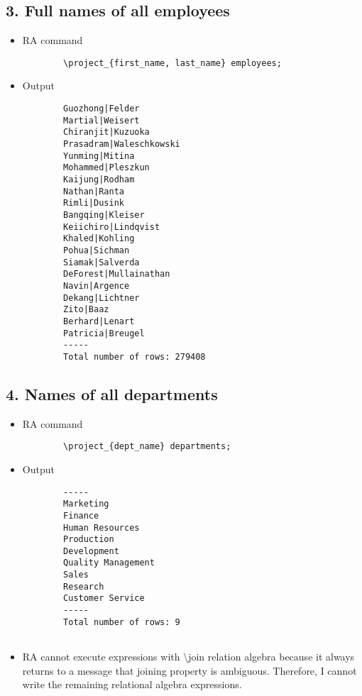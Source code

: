 \documentclass[13pt,a4paper]{report}
\begin{document}
\subsection*{3. Full names of all employees}
\begin{itemize}
	The RA command \textbackslash rename only supports renaming of attributes; it does not support renaming of the input relation. So we just use the \textbackslash project to get first name and last name of the employees.
	\item RA command
	\begin{lstlisting}
		\project_{first_name, last_name} employees;
	\end{lstlisting}

	\item Output
	\begin{lstlisting}
		Guozhong|Felder
		Martial|Weisert
		Chiranjit|Kuzuoka
		Prasadram|Waleschkowski
		Yunming|Mitina
		Mohammed|Pleszkun
		Kaijung|Rodham
		Nathan|Ranta
		Rimli|Dusink
		Bangqing|Kleiser
		Keiichiro|Lindqvist
		Khaled|Kohling
		Pohua|Sichman
		Siamak|Salverda
		DeForest|Mullainathan
		Navin|Argence
		Dekang|Lichtner
		Zito|Baaz
		Berhard|Lenart
		Patricia|Breugel
		-----
		Total number of rows: 279408

	\end{lstlisting}
\end{itemize}

\subsection*{4. Names of all departments}
\begin{itemize}
	\item RA command
	\begin{lstlisting}
		\project_{dept_name} departments;
	\end{lstlisting}

	\item Output
	\begin{lstlisting}
		-----
		Marketing
		Finance
		Human Resources
		Production
		Development
		Quality Management
		Sales
		Research
		Customer Service
		-----
		Total number of rows: 9
		
	\end{lstlisting}
\item RA cannot execute expressions with \textbackslash join relation algebra because it always returns to a message that joining property is  ambiguous. Therefore, I cannot write the remaining relational algebra expressions.
\end{itemize}
\end{document}
